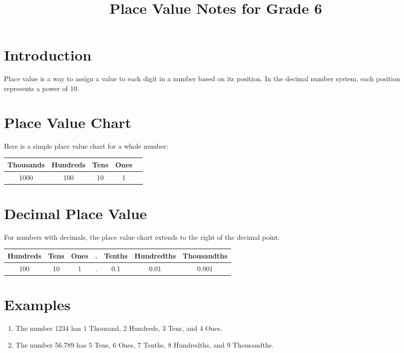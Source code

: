 \documentclass{article}
\begin{document}
\title{Place Value Notes for Grade 6}
\maketitle

\section{Introduction}
Place value is a way to assign a value to each digit in a number based on its position. In the decimal number system, each position represents a power of 10.

\section{Place Value Chart}
Here is a simple place value chart for a whole number:

\begin{center}
\begin{tabular}{|c|c|c|c|c|}
\hline
Thousands & Hundreds & Tens & Ones \\
\hline
1000 & 100 & 10 & 1 \\
\hline
\end{tabular}
\end{center}

\section{Decimal Place Value}
For numbers with decimals, the place value chart extends to the right of the decimal point:

\begin{center}
\begin{tabular}{|c|c|c|c|c|c|c|}
\hline
Hundreds & Tens & Ones & . & Tenths & Hundredths & Thousandths \\
\hline
100 & 10 & 1 & . & 0.1 & 0.01 & 0.001 \\
\hline
\end{tabular}
\end{center}

\section{Examples}
\begin{enumerate}
\item The number 1234 has 1 Thousand, 2 Hundreds, 3 Tens, and 4 Ones.
\item The number 56.789 has 5 Tens, 6 Ones, 7 Tenths, 8 Hundredths, and 9 Thousandths.
\end{enumerate}
\end{document}

